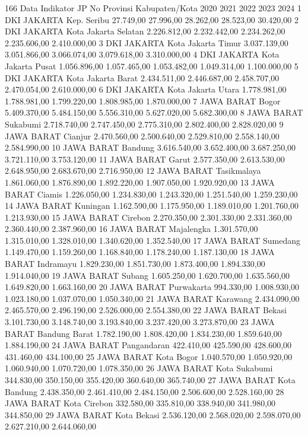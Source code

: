 166
Data Indikator JP
No Provinsi Kabupaten/Kota 2020 2021 2022 2023 2024
1 DKI JAKARTA Kep. Seribu 27.749,00 27.996,00 28.262,00 28.523,00 30.420,00
2 DKI JAKARTA Kota Jakarta Selatan 2.226.812,00 2.232.442,00 2.234.262,00 2.235.606,00 2.410.000,00
3 DKI JAKARTA Kota Jakarta Timur 3.037.139,00 3.051.866,00 3.066.074,00 3.079.618,00 3.310.000,00
4 DKI JAKARTA Kota Jakarta Pusat 1.056.896,00 1.057.465,00 1.053.482,00 1.049.314,00 1.100.000,00
5 DKI JAKARTA Kota Jakarta Barat 2.434.511,00 2.446.687,00 2.458.707,00 2.470.054,00 2.610.000,00
6 DKI JAKARTA Kota Jakarta Utara 1.778.981,00 1.788.981,00 1.799.220,00 1.808.985,00 1.870.000,00
7 JAWA BARAT Bogor 5.409.370,00 5.484.150,00 5.556.310,00 5.627.020,00 5.682.300,00
8 JAWA BARAT Sukabumi 2.718.740,00 2.747.450,00 2.775.310,00 2.802.400,00 2.828.020,00
9 JAWA BARAT Cianjur 2.470.560,00 2.500.640,00 2.529.810,00 2.558.140,00 2.584.990,00
10 JAWA BARAT Bandung 3.616.540,00 3.652.400,00 3.687.250,00 3.721.110,00 3.753.120,00
11 JAWA BARAT Garut 2.577.350,00 2.613.530,00 2.648.950,00 2.683.670,00 2.716.950,00
12 JAWA BARAT Tasikmalaya 1.861.060,00 1.876.890,00 1.892.220,00 1.907.050,00 1.920.920,00
13 JAWA BARAT Ciamis 1.226.050,00 1.234.830,00 1.243.320,00 1.251.540,00 1.259.230,00
14 JAWA BARAT Kuningan 1.162.590,00 1.175.950,00 1.189.010,00 1.201.760,00 1.213.930,00
15 JAWA BARAT Cirebon 2.270.350,00 2.301.330,00 2.331.360,00 2.360.440,00 2.387.960,00
16 JAWA BARAT Majalengka 1.301.570,00 1.315.010,00 1.328.010,00 1.340.620,00 1.352.540,00
17 JAWA BARAT Sumedang 1.149.470,00 1.159.260,00 1.168.840,00 1.178.240,00 1.187.130,00
18 JAWA BARAT Indramayu 1.829.230,00 1.851.730,00 1.873.400,00 1.894.330,00 1.914.040,00
19 JAWA BARAT Subang 1.605.250,00 1.620.700,00 1.635.560,00 1.649.820,00 1.663.160,00
20 JAWA BARAT Purwakarta 994.330,00 1.008.930,00 1.023.180,00 1.037.070,00 1.050.340,00
21 JAWA BARAT Karawang 2.434.090,00 2.465.570,00 2.496.190,00 2.526.000,00 2.554.380,00
22 JAWA BARAT Bekasi 3.101.730,00 3.148.740,00 3.193.840,00 3.237.420,00 3.273.870,00
23 JAWA BARAT Bandung Barat 1.782.190,00 1.808.420,00 1.834.230,00 1.859.640,00 1.884.190,00
24 JAWA BARAT Pangandaran 422.410,00 425.590,00 428.600,00 431.460,00 434.100,00
25 JAWA BARAT Kota Bogor 1.040.570,00 1.050.920,00 1.060.940,00 1.070.720,00 1.078.350,00
26 JAWA BARAT Kota Sukabumi 344.830,00 350.150,00 355.420,00 360.640,00 365.740,00
27 JAWA BARAT Kota Bandung 2.438.350,00 2.461.410,00 2.484.150,00 2.506.600,00 2.528.160,00
28 JAWA BARAT Kota Cirebon 332.580,00 335.810,00 338.940,00 341.980,00 344.850,00
29 JAWA BARAT Kota Bekasi 2.536.120,00 2.568.020,00 2.598.070,00 2.627.210,00 2.644.060,00
